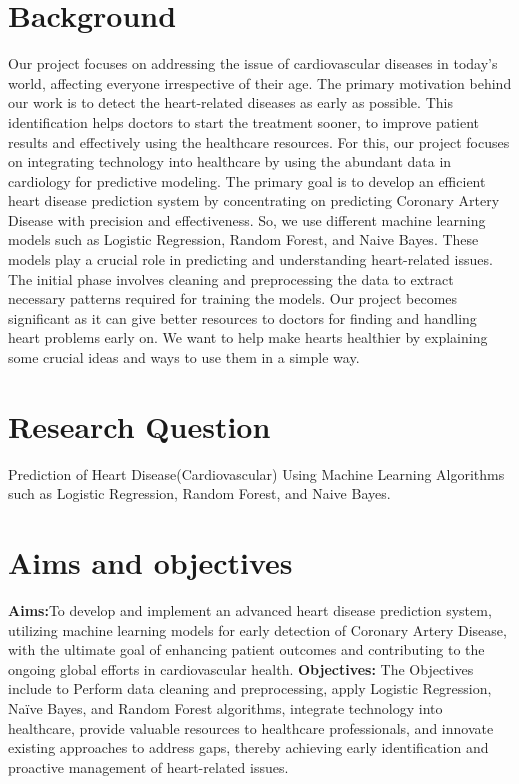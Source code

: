 \section{Background}
\label{sec:into_back}
Our project focuses on addressing the issue of cardiovascular diseases in today's world, affecting everyone irrespective of their age. The primary motivation behind our work is to detect the heart-related diseases as early as possible. This identification helps doctors to start the treatment sooner, to improve patient results and effectively using the healthcare resources. For this, our project focuses on integrating technology into healthcare by using the abundant data in cardiology for predictive modeling. The primary goal is to develop an efficient heart disease prediction system by concentrating on predicting Coronary Artery Disease with precision and effectiveness. So, we use different machine learning models such as Logistic Regression, Random Forest, and Naive Bayes. These models play a crucial role in predicting and understanding heart-related issues. The initial phase involves cleaning and preprocessing the data to extract necessary patterns required for training the models. Our project becomes significant as it can give better resources to doctors for finding and handling heart problems early on. We want to help make hearts healthier by explaining some crucial ideas and ways to use them in a simple way.

\section{Research Question}
\label{sec:intro_prob_art}
Prediction of Heart Disease(Cardiovascular) Using Machine Learning Algorithms such as Logistic Regression, Random Forest, and Naive Bayes.

\section{Aims and objectives}
\label{sec:intro_aims_obj}
 

\textbf{Aims:}To develop and implement an advanced heart disease prediction system, utilizing machine learning models for early detection of Coronary Artery Disease, with the ultimate goal of enhancing patient outcomes and contributing to the ongoing global efforts in cardiovascular health.
\textbf{Objectives:} The Objectives include to Perform data cleaning and preprocessing, apply Logistic Regression, Naïve Bayes, and Random Forest algorithms, integrate technology into healthcare, provide valuable resources to healthcare professionals, and innovate existing approaches to address gaps, thereby achieving early identification and proactive management of heart-related issues.



